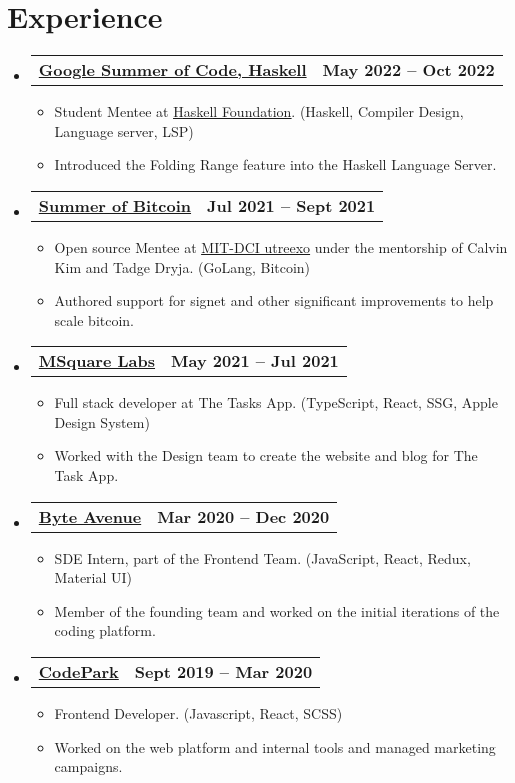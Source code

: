 \documentclass[a4paper,11pt]{article}
\makeatletter
\newcommand{\resumeItem}[1]{
  \item\small{
    {#1 \vspace{-2pt}}
  }
}
\newcommand{\resumeSubheadingg}[2]{
  \vspace{-2pt}\item
    \begin{tabular*}{1.0\textwidth}[t]{l@{\extracolsep{\fill}}r}
      \textbf{#1} & \textbf{\small #2} \\
    \end{tabular*}\vspace{-7pt}
}
\newcommand{\resumeSubHeadingListStart}{\begin{itemize}[leftmargin=0.0in, label={}]}
\newcommand{\resumeSubHeadingListEnd}{\end{itemize}}
\newcommand{\resumeItemListStart}{\begin{itemize}}
\newcommand{\resumeItemListEnd}{\end{itemize}\vspace{-5pt}}
\makeatother
\begin{document}
\section{Experience}
  \resumeSubHeadingListStart

 \resumeSubheadingg
      {\href{https://summerofcode.withgoogle.com/}{Google Summer of Code, Haskell}}{May 2022 -- Oct 2022}
      \resumeItemListStart
        \resumeItem{Student Mentee at \underline{\href{https://www.github.com/haskell}{Haskell Foundation}}. (Haskell, Compiler Design, Language server, LSP)}
        \resumeItem{Introduced the Folding Range feature into the Haskell Language Server.}
    \resumeItemListEnd

    \resumeSubheadingg
      {\href{https://www.summerofbitcoin.org/}{Summer of Bitcoin}}{Jul 2021 -- Sept 2021}
      \resumeItemListStart
        \resumeItem{Open source Mentee at \underline{\href{https://www.github.com/utreexo}{MIT-DCI utreexo}} under the mentorship of Calvin Kim and Tadge Dryja. (GoLang, Bitcoin)}
        \resumeItem{Authored support for signet and other significant improvements to help scale bitcoin.}
    \resumeItemListEnd

  \resumeSubheadingg
      {\href{https://twitter.com/thetaskapp}{MSquare Labs}}{May 2021 -- Jul 2021}
      \resumeItemListStart
        \resumeItem{Full stack developer at The Tasks App. (TypeScript, React, SSG, Apple Design System)}
        \resumeItem{Worked with the Design team to create the website and blog for The Task App.}
    \resumeItemListEnd

    \resumeSubheadingg
      {\href{https://byteavenue.org}{Byte Avenue}}{Mar 2020 -- Dec 2020}
      \resumeItemListStart
        \resumeItem{SDE Intern, part of the Frontend Team. (JavaScript, React, Redux, Material UI)}
        \resumeItem{Member of the founding team and worked on the initial iterations of the coding platform.}
    \resumeItemListEnd
    
    \resumeSubheadingg
      {\href{https://byteavenue.org}{CodePark}}{Sept 2019 -- Mar 2020}
      \resumeItemListStart
        \resumeItem{Frontend Developer. (Javascript, React, SCSS)}
        \resumeItem{Worked on the web platform and internal tools and managed marketing campaigns.}
    \resumeItemListEnd
    
  \resumeSubHeadingListEnd
\vspace{-16pt}
\end{document}
